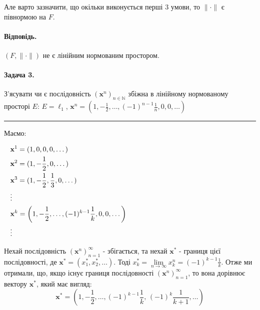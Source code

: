 \documentclass[a5paper, 20pt, titlepage]{article}
\newcommand{\x}{\textbf{x}}
\begin{document}
Але варто зазначити, що окільки виконується перші 3 умови, то $\| \cdot \|$ є півнормою на $F$. 

\vspace{4mm}
\paragraph{Відповідь.} $(F, \|\cdot \|)$ не є лінійним нормованим простором.

\vspace{7mm}

\paragraph{Задача 3.} \hfill \nolinebreak З'ясувати чи є послідовність $(\x^n)_{n \in \mathbb{N}}$ збіжна в лінійному нормованому просторі \newline $E$: $E = \ell_1$, $\x^n = \left(1, -\frac{1}{2}, \dots, (-1)^{n-1}\frac{1}{n}, 0, 0, \dots \right)$

\vspace{3mm}

\noindent\rule{4cm}{0.4pt}

Маємо:

\vspace{3mm}

$
\begin{aligned}
\hspace{3mm}
&\x^1 = (1, 0, 0, 0, \dots) \\
&\x^2 = (1, -\frac{1}{2}, 0, \dots) \\
&\x^3 = (1, -\frac{1}{2}, \frac{1}{3}, 0, \dots) \\
&\vdots \\
&\x^k = \left(1, -\frac{1}{2}, \dots, (-1)^{k-1}\frac{1}{k}, 0, 0, \dots \right) \\
&\vdots \\
\end{aligned}
$

\vspace{3mm}

Нехай послідовність $(\x^n)_{n=1}^\infty$ - збігається, та нехай $\x^*$ - границя цієї послідовності, де $\x^* = (x^*_1, x^*_2, \dots)$. \newline
Тоді $x^*_{k} = \lim \limits_{n \to \infty} x_{k}^{n} = (-1)^{k-1} \frac{1}{k}$. Отже ми отримали, що, якщо існує границя послідовності $(\x^n)_{n=1}^{\infty}$, то вона дорівнює вектору $\x^*$, який має вигляд: $$\x^* = \left(1, -\frac{1}{2}, \dots, (-1)^{k-1}\frac{1}{k}, \, (-1)^{k} \frac{1}{k+1}, \dots \right)$$
\end{document}
